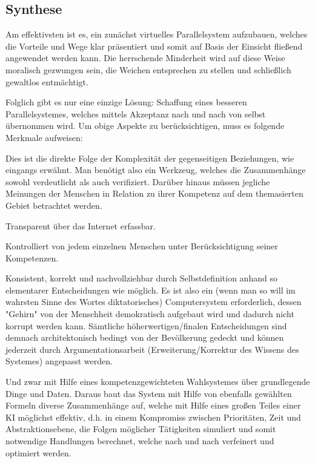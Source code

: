 \subsection{Synthese}\label{sec:consequences/synthesis}

Am effektivsten ist es, ein zunächst virtuelles Parallelsystem aufzubauen, welches die Vorteile und Wege klar präsentiert und somit auf Basis der Einsicht fließend angewendet werden kann. Die herrschende Minderheit wird auf diese Weise moralisch gezwungen sein, die Weichen entsprechen zu stellen und schließlich gewaltlos entmächtigt.

Folglich gibt es nur eine einzige Lösung: Schaffung eines besseren Parallelsystemes, welches mittels Akzeptanz nach und nach von selbst übernommen wird. Um obige Aspekte zu berücksichtigen, muss es folgende Merkmale aufweisen:

Dies ist die direkte Folge der Komplexität der gegenseitigen Beziehungen, wie eingangs erwähnt. Man benötigt also ein Werkzeug, welches die Zusammenhänge sowohl verdeutlicht als auch verifiziert. Darüber hinaus müssen jegliche Meinungen der Menschen in Relation zu ihrer Kompetenz auf dem themasierten Gebiet betrachtet werden.
\medskip
\begin{compactitem}
\item Transparent über das Internet erfassbar.
\item Kontrolliert von jedem einzelnen Menschen unter Berücksichtigung seiner Kompetenzen.
\item Konsistent, korrekt und nachvollziehbar durch Selbstdefinition anhand so elementarer Entscheidungen wie möglich. Es ist also ein (wenn man so will im wahrsten Sinne des Wortes diktatorisches) Computersystem erforderlich, dessen "Gehirn" von der Menschheit demokratisch aufgebaut wird und dadurch nicht korrupt werden kann. Sämtliche höherwertigen/finalen Entscheidungen sind demnach architektonisch bedingt von der Bevölkerung gedeckt und können jederzeit durch Argumentationsarbeit (Erweiterung/Korrektur des Wissens des Systemes) angepasst werden.
\end{compactitem}
\medskip

Und zwar mit Hilfe eines kompetenzgewichteten Wahlsystemes über grundlegende Dinge und Daten. Daraus baut das System mit Hilfe von ebenfalls gewählten Formeln diverse Zusammenhänge auf, welche mit Hilfe eines großen Teiles einer KI möglichst effektiv, d.h. in einem Kompromiss zwischen Prioritäten, Zeit und Abstraktionsebene, die Folgen möglicher Tätigkeiten simuliert und somit notwendige Handlungen berechnet, welche nach und nach verfeinert und optimiert werden.